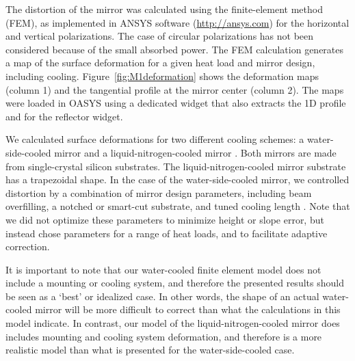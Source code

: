 \documentclass{iucr}
\begin{document}
The distortion of the mirror was calculated using the finite-element method (FEM), as implemented in ANSYS software (\url{http://ansys.com}) for the horizontal and vertical polarizations. The case of circular polarizations has not been considered because of the small absorbed power. The FEM calculation generates a map of the surface deformation for a given heat load and mirror design, including cooling. Figure~\ref{fig:M1deformation} shows the deformation maps (column 1) and the tangential profile at the mirror center (column 2). The maps were loaded in OASYS using a dedicated widget that also extracts the 1D profile and for the reflector widget.

We calculated surface deformations for two different cooling schemes: a water-side-cooled mirror and a liquid-nitrogen-cooled mirror \cite{cutler}. Both mirrors are made from single-crystal silicon substrates.
The liquid-nitrogen-cooled mirror substrate has a trapezoidal shape. In the case of the water-side-cooled mirror, we controlled distortion by a combination of mirror design parameters, including beam overfilling, a notched or smart-cut substrate, and tuned cooling length \cite{Zhang}. Note that we did not optimize these parameters to minimize height or slope error, but instead chose parameters for a range of heat loads, and to facilitate adaptive correction.

It is important to note that our water-cooled finite element model does not include a mounting or cooling system, and therefore the presented results should be seen as a `best' or idealized case.  In other words, the shape of an actual water-cooled mirror will be more difficult to correct than what the calculations in this model indicate. In contrast, our model of the liquid-nitrogen-cooled mirror does includes mounting and cooling system deformation, and therefore is a more realistic model than what is presented for the water-side-cooled case.
\end{document}
